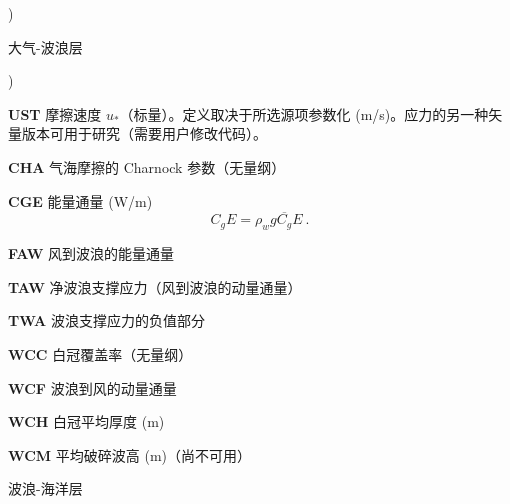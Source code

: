 \begin{list}{)\hfill}
\item{大气-波浪层}
\begin{list}{)\hfill}
            { \leftmargin 8mm 
             \rightmargin 0mm \itemsep 0mm \parsep 0mm}
\item \textbf{UST} 摩擦速度 $u_\ast$（标量）。定义取决于所选源项参数化 (m/s)。应力的另一种矢量版本可用于研究（需要用户修改代码）。
\item \textbf{CHA} 气海摩擦的 Charnock 参数（无量纲）
\item \textbf{CGE} 能量通量 (W/m)
      \begin{equation} C_g E =  \rho_w g \overline{C_g} E
      \: . \label{eq:CgE} \end{equation}
\item \textbf{FAW} 风到波浪的能量通量
\item \textbf{TAW} 净波浪支撑应力（风到波浪的动量通量）
\item \textbf{TWA} 波浪支撑应力的负值部分
\item \textbf{WCC} 白冠覆盖率（无量纲）
\item \textbf{WCF} 波浪到风的动量通量
\item \textbf{WCH} 白冠平均厚度 (m)
\item \textbf{WCM} 平均破碎波高 (m)（尚不可用）
\end{list}

\item{波浪-海洋层}


\end{list}
